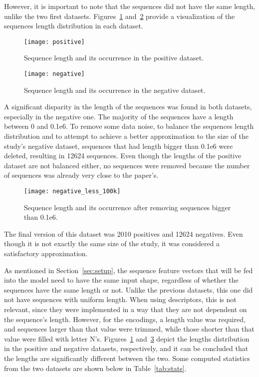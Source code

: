 However, it is important to note that the sequences did not have the same length, unlike the two first datasets. Figures~\ref{fig:deg_length} and~\ref{fig:negative}  provide a visualization of the sequences length distribution in each dataset.

\begin{figure}[htbp]
    \centering
    \texttt{[image: positive]}
    \caption{Sequence length and its occurrence in the positive dataset.}
    \label{fig:deg_length}
\end{figure}

\begin{figure}[htbp]
    \centering
    \texttt{[image: negative]}
    \caption{Sequence length and its occurrence in the negative dataset.}
    \label{fig:negative}
\end{figure}

A significant disparity in the length of the sequences was found in both datasets, especially in the negative one. The majority of the sequences have a length between 0 and 0.1e6. To remove some data noise, to balance the sequences length distribution and to attempt to achieve a better approximation to the size of the study's negative dataset, sequences that had length bigger than 0.1e6 were deleted, resulting in 12624 sequences. Even though the lengths of the positive dataset are not balanced either, no sequences were removed because the number of sequences was already very close to the paper's.

\begin{figure}[htbp]
    \centering
    \texttt{[image: negative\_less\_100k]}
    \caption{Sequence length and its occurrence after removing sequences bigger than 0.1e6.}
    \label{fig:negative_less_100k}
\end{figure}

The final version of this dataset was 2010 positives and 12624 negatives. Even though it is not exactly the same size of the study, it was considered a satisfactory approximation.

As mentioned in Section~\ref{sec:setup}, the sequence feature vectors that will be fed into the model need to have the same input shape, regardless of whether the sequences have the same length or not. Unlike the previous datasets, this one did not have sequences with uniform length. When using descriptors, this is not relevant, since they were implemented in a way that they are not dependent on the sequence's length. However, for the encodings, a length value was required, and sequences larger than that value were trimmed, while those shorter than that value were filled with letter N's. Figures~\ref{fig:deg_length} and~\ref{fig:negative_less_100k} depict the lengths distribution in the positive and negative datasets, respectively, and it can be concluded that the lengths are significantly different between the two. Some computed statistics from the two datasets are shown below in Table~\ref{tab:stats}.

